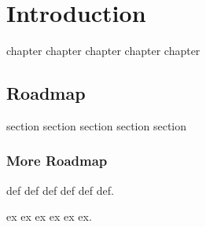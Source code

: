 \chapter{Introduction}

chapter chapter chapter
chapter chapter

\section{Roadmap}

section section section
section section

\subsection{More Roadmap}
\begin{definition}
  def def def
  def
  def def.
\end{definition}


\begin{example}
  ex ex ex
  ex
  ex ex.
\end{example}


